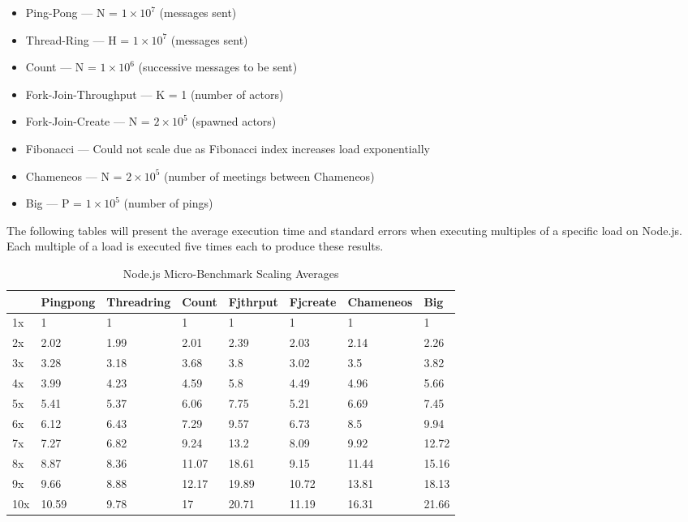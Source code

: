 \documentclass[oneside]{um-fict}
\begin{document}
\begin{itemize}
    \item Ping-Pong --- N = $1\times10^7$ (messages sent)
    \item Thread-Ring --- H = $1\times10^7$ (messages sent)
    \item Count --- N = $1\times10^6$ (successive messages to be sent)
    \item Fork-Join-Throughput --- K = 1 (number of actors)
    \item Fork-Join-Create --- N = $2\times10^5$ (spawned actors)
    \item Fibonacci --- Could not scale due as Fibonacci index increases load exponentially 
    \item Chameneos --- N = $2\times10^5$ (number of meetings between Chameneos)
    \item Big --- P = $1\times10^5$ (number of pings) 
\end{itemize}

The following tables will present the average execution time and standard errors when executing multiples of a specific load on Node.js. Each multiple of a load is executed five times each to produce these results.
\begin{table}[H]
    \begin{center}
        \begin{tabular}{|l|lllllll|}
        \hline
        & Pingpong & Threadring & Count & Fjthrput & Fjcreate & Chameneos  & Big   \\ \hline
        1x & 1        & 1          & 1     & 1        & 1        & 1     & 1     \\
        2x & 2.02     & 1.99       & 2.01  & 2.39     & 2.03     & 2.14  & 2.26  \\
        3x  & 3.28     & 3.18       & 3.68  & 3.8      & 3.02     & 3.5   & 3.82  \\
        4x & 3.99     & 4.23       & 4.59  & 5.8      & 4.49     & 4.96  & 5.66  \\
        5x  & 5.41     & 5.37       & 6.06  & 7.75     & 5.21     & 6.69  & 7.45  \\
        6x & 6.12     & 6.43       & 7.29  & 9.57     & 6.73     & 8.5   & 9.94  \\
        7x & 7.27     & 6.82       & 9.24  & 13.2     & 8.09     & 9.92  & 12.72 \\
        8x & 8.87     & 8.36       & 11.07 & 18.61    & 9.15     & 11.44 & 15.16 \\
        9x & 9.66     & 8.88       & 12.17 & 19.89    & 10.72    & 13.81 & 18.13 \\
        10x & 10.59    & 9.78       & 17    & 20.71    & 11.19    & 16.31 & 21.66 \\ \hline
        \end{tabular}
        \caption{Node.js Micro-Benchmark Scaling Averages}\label{tab:nodeloadscalingavg}
    \end{center}
\end{table}
\end{document}
